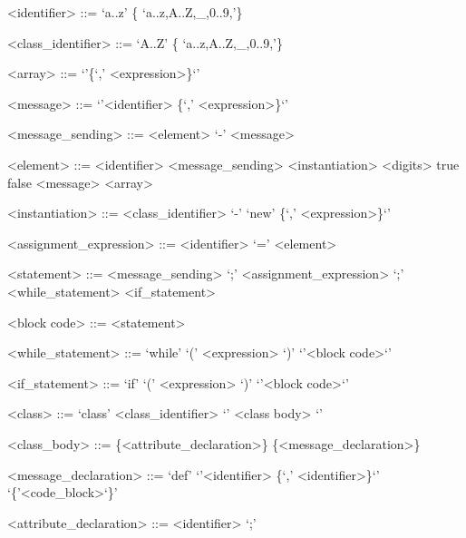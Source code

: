 \documentclass{eplDoc}
\begin{document}
\maketitle
\newpage

\begin{grammar}
<identifier> ::= `a..z' \{ `a..z,A..Z,\_,0..9,'\} 

<class\_identifier> ::= `A..Z' \{ `a..z,A..Z,\_,0..9,'\} 

<array> ::= `{'\{`,' <expression>\}`}'

<message> ::= `{'<identifier> \{`,' <expression>\}`}'

<message\_sending> ::= <element> `\<-' <message>

<element> ::= <identifier> 
\alt<message\_sending>
\alt<instantiation>
\alt<digits>
\alt true \alt false
\alt <message>
\alt <array>


<instantiation> ::= <class\_identifier> `\<-' `{new' \{`,' <expression>\}`}'


<assignment\_expression> ::= <identifier> `=' <element>

<statement> ::= <message_sending> `;'
\alt <assignment\_expression>
 `;'
\alt <while\_statement>
\alt <if\_statement>

<block code> ::= { <statement> }

<while\_statement> ::= `while' `(' <expression> `)'  `{'<block code>`}'

<if\_statement> ::= `if' `(' <expression> `)'  `{'<block code>`}'




<class> ::= `class' <class\_identifier> `{' <class body> `}'

<class\_body> ::= \{<attribute\_declaration>\} \{<message\_declaration>\}

<message\_declaration> ::= `def'  `{'<identifier> \{`,' <identifier>\}`}' `\{'<code\_block>`\}'

<attribute\_declaration> ::= <identifier> `;'









\end{grammar}
\end{document}
